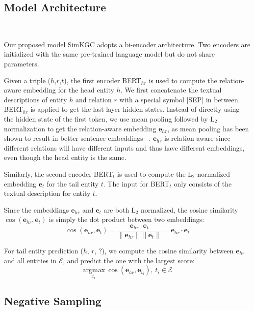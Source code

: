 \documentclass[11pt]{article}
\begin{document}
\subsection{Model Architecture} ~\label{sec:arch}

Our proposed model SimKGC adopts a bi-encoder architecture.
Two encoders are initialized with the same pre-trained language model
but do not share parameters.

Given a triple ($h$,$r$,$t$),
the first encoder BERT$_{hr}$ is used to compute
the relation-aware embedding for the head entity $h$.
We first concatenate the textual descriptions of entity $h$
and relation $r$ with a special symbol [SEP] in between.
BERT$_{hr}$ is applied to get the last-layer hidden states.
Instead of directly using the hidden state of the first token,
we use mean pooling followed by L$_2$ normalization
to get the relation-aware embedding $\mathbf{e}_{hr}$,
as mean pooling has been shown to result in
better sentence embeddings ~\citep{gao2021simcse,Reimers2019SentenceBERTSE}.
$\mathbf{e}_{hr}$ is relation-aware
since different relations will have different inputs
and thus have different embeddings,
even though the head entity is the same.

Similarly,
the second encoder BERT$_{t}$ is used to
compute the L$_2$-normalized embedding $\mathbf{e}_t$ for the tail entity $t$.
The input for BERT$_{t}$ only consists of the textual description for entity $t$.

Since the embeddings $\mathbf{e}_{hr}$ and $\mathbf{e}_{t}$ are both L$_2$ normalized,
the cosine similarity $\cos(\mathbf{e}_{hr}, \mathbf{e}_{t})$
is simply the dot product between two embeddings:
\begin{equation} \label{eq:cos}
\cos(\mathbf{e}_{hr}, \mathbf{e}_{t}) =
\frac{\mathbf{e}_{hr}\cdot\mathbf{e}_t}{\lVert \mathbf{e}_{hr} \rVert \lVert \mathbf{e}_t \rVert}
=\mathbf{e}_{hr}\cdot\mathbf{e}_t
\end{equation}

For tail entity prediction ($h$, $r$, $?$),
we compute the cosine similarity between $\mathbf{e}_{hr}$
and all entities in $\mathcal{E}$,
and predict the one with the largest score:
\begin{equation} \label{eq:argmax}
\underset{t_i}{\mathrm{argmax}}\ \cos(\mathbf{e}_{hr}, \mathbf{e}_{t_i}),\ t_i \in \mathcal{E}
\end{equation}

\subsection{Negative Sampling}
\end{document}

